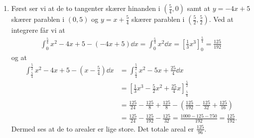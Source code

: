 \begin{enumerate}
	\item\label{it:bes1ans} Først ser vi at de to tangenter skærer hinanden i $(\frac{5}{4},0)$ samt at $y=-4x+5$ skærer parablen i $(0,5)$ og $y=x+\frac{5}{4}$ skærer parablen i $(\frac{5}{2},\frac{5}{2})$.  Ved at integrere får vi at
	\begin{align*}
	\int_0^{\frac{5}{4}} x^2-4x+5-(-4x+5)\dd x=\int_0^{\frac{5}{4}} x^2\dd x=[\frac{1}{3}x^3]_0^{\frac{5}{4}}=\frac{125}{192}
	\end{align*}
	og at
	\begin{align*}
	\int_{\frac{5}{4}}^{\frac{5}{2}} x^2-4x+5-(x-\frac{5}{4})\dd x&=\int_{\frac{5}{4}}^{\frac{5}{2}} x^2-5x+\frac{25}{4}\dd x\\&
	=[\frac{1}{3}x^3-\frac{5}{2}x^2+\frac{25}{4}x]_{\frac{5}{4}}^{\frac{5}{2}}\\
	&=\frac{125}{24}-\frac{125}{8}+\frac{125}{8}-(\frac{125}{192}-\frac{125}{32}+\frac{125}{16})\\
	&=\frac{125}{24}-\frac{125}{192}-\frac{125}{32}=\frac{1000-125-750}{192}=\frac{125}{192}.
	\end{align*}
	Dermed ses at de to arealer er lige store. Det totale areal er $ \frac{125}{96}$.
	
%	
	
\end{enumerate}